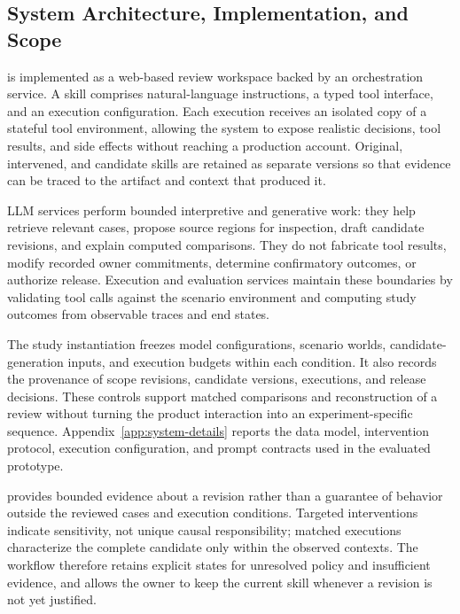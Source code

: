 \subsection{System Architecture, Implementation, and Scope}
\label{sec:system-implementation}

\systemname{} is implemented as a web-based review workspace backed by an
orchestration service. A skill comprises natural-language instructions, a
typed tool interface, and an execution configuration. Each execution receives
an isolated copy of a stateful tool environment, allowing the system to expose
realistic decisions, tool results, and side effects without reaching a
production account. Original, intervened, and candidate skills are retained as
separate versions so that evidence can be traced to the artifact and context
that produced it.

LLM services perform bounded interpretive and generative work: they help
retrieve relevant cases, propose source regions for inspection, draft
candidate revisions, and explain computed comparisons. They do not fabricate
tool results, modify recorded owner commitments, determine confirmatory
outcomes, or authorize release. Execution and evaluation services maintain
these boundaries by validating tool calls against the scenario environment and
computing study outcomes from observable traces and end states.

The study instantiation freezes model configurations, scenario worlds,
candidate-generation inputs, and execution budgets within each condition.
It also records the provenance of scope revisions, candidate versions,
executions, and release decisions. These controls support matched comparisons
and reconstruction of a review without turning the product interaction into an
experiment-specific sequence. Appendix~\ref{app:system-details} reports the
data model, intervention protocol, execution configuration, and prompt
contracts used in the evaluated prototype.

\systemname{} provides bounded evidence about a revision rather than a
guarantee of behavior outside the reviewed cases and execution conditions.
Targeted interventions indicate sensitivity, not unique causal responsibility;
matched executions characterize the complete candidate only within the
observed contexts. The workflow therefore retains explicit states for
unresolved policy and insufficient evidence, and allows the owner to keep the
current skill whenever a revision is not yet justified.
